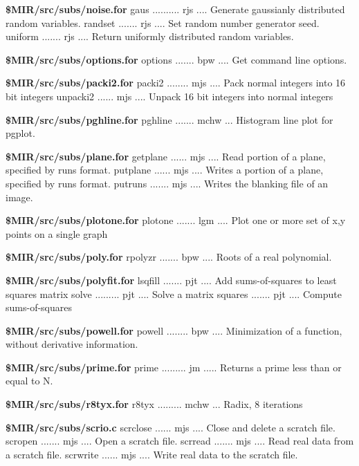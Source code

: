\par{\bf \$MIR/src/subs/noise.for}
{\eightpoint\begintt
gaus .......... rjs .... Generate gaussianly distributed random variables.
randset ....... rjs .... Set random number generator seed.
uniform ....... rjs .... Return uniformly distributed random variables.
\endtt}
\par{\bf \$MIR/src/subs/options.for}
{\eightpoint\begintt
options ....... bpw .... Get command line options.
\endtt}
\par{\bf \$MIR/src/subs/packi2.for}
{\eightpoint\begintt
packi2 ........ mjs .... Pack normal integers into 16 bit integers
unpacki2 ...... mjs .... Unpack 16 bit integers into normal integers
\endtt}
\par{\bf \$MIR/src/subs/pghline.for}
{\eightpoint\begintt
pghline ....... mchw ... Histogram line plot for pgplot.
\endtt}
\par{\bf \$MIR/src/subs/plane.for}
{\eightpoint\begintt
getplane ...... mjs .... Read portion of a plane, specified by runs format.
putplane ...... mjs .... Writes a portion of a plane, specified by runs format.
putruns ....... mjs .... Writes the blanking file of an image.
\endtt}
\par{\bf \$MIR/src/subs/plotone.for}
{\eightpoint\begintt
plotone ....... lgm .... Plot one or more set of x,y points on a single graph
\endtt}
\par{\bf \$MIR/src/subs/poly.for}
{\eightpoint\begintt
rpolyzr ....... bpw .... Roots of a real polynomial.
\endtt}
\par{\bf \$MIR/src/subs/polyfit.for}
{\eightpoint\begintt
lsqfill ....... pjt .... Add sums-of-squares to least squares matrix
solve ......... pjt .... Solve a matrix
squares ....... pjt .... Compute sums-of-squares
\endtt}
\par{\bf \$MIR/src/subs/powell.for}
{\eightpoint\begintt
powell ........ bpw .... Minimization of a function, without derivative information.
\endtt}
\par{\bf \$MIR/src/subs/prime.for}
{\eightpoint\begintt
prime ......... jm ..... Returns a prime less than or equal to N.
\endtt}
\par{\bf \$MIR/src/subs/r8tyx.for}
{\eightpoint\begintt
r8tyx ......... mchw ... Radix, 8 iterations
\endtt}
\par{\bf \$MIR/src/subs/scrio.c}
{\eightpoint\begintt
scrclose ...... mjs .... Close and delete a scratch file.
scropen ....... mjs .... Open a scratch file.
scrread ....... mjs .... Read real data from a scratch file.
scrwrite ...... mjs .... Write real data to the scratch file.
\endtt}
